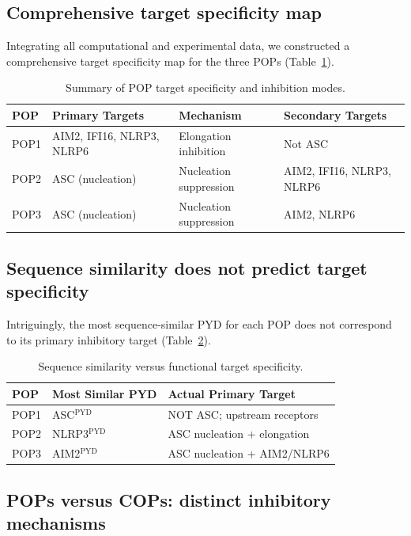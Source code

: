 \documentclass[11pt,a4paper]{article}
\begin{document}
\subsection{Comprehensive target specificity map}

Integrating all computational and experimental data, we constructed a comprehensive target specificity map for the three POPs (Table~\ref{tab:summary}).

\begin{table}[htbp]
\centering
\caption{Summary of POP target specificity and inhibition modes.}
\label{tab:summary}
\begin{tabular}{llll}
\toprule
\textbf{POP} & \textbf{Primary Targets} & \textbf{Mechanism} & \textbf{Secondary Targets} \\
\midrule
POP1 & AIM2, IFI16, NLRP3, NLRP6 & Elongation inhibition & Not ASC \\
POP2 & ASC (nucleation) & Nucleation suppression & AIM2, IFI16, NLRP3, NLRP6 \\
POP3 & ASC (nucleation) & Nucleation suppression & AIM2, NLRP6 \\
\bottomrule
\end{tabular}
\end{table}

\subsection{Sequence similarity does not predict target specificity}

Intriguingly, the most sequence-similar PYD for each POP does not correspond to its primary inhibitory target (Table~\ref{tab:sequence}).

\begin{table}[htbp]
\centering
\caption{Sequence similarity versus functional target specificity.}
\label{tab:sequence}
\begin{tabular}{lll}
\toprule
\textbf{POP} & \textbf{Most Similar PYD} & \textbf{Actual Primary Target} \\
\midrule
POP1 & ASC$^{\text{PYD}}$ & NOT ASC; upstream receptors \\
POP2 & NLRP3$^{\text{PYD}}$ & ASC nucleation + elongation \\
POP3 & AIM2$^{\text{PYD}}$ & ASC nucleation + AIM2/NLRP6 \\
\bottomrule
\end{tabular}
\end{table}

\subsection{POPs versus COPs: distinct inhibitory mechanisms}
\end{document}
